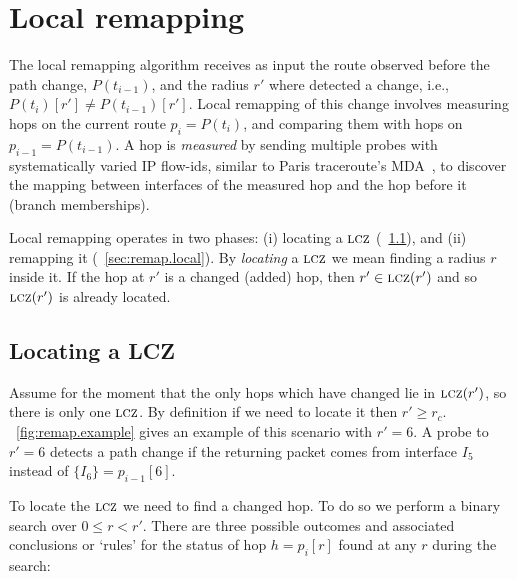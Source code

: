\section{Local remapping}
\label{sec:remap}

\def\Pi{p_i}
\def\Pii{p_{i-1}}

The local remapping algorithm receives as input the route observed
before the path change, $P(t_{i-1})$, and the radius $r'$ where
\dtrack{} detected a change, i.e., $P(t_i)[r'] \ne P(t_{i-1})[r']$.
Local remapping of this change involves measuring hops on the current
route $\Pi=P(t_i)$, and comparing them with hops on
$\Pii\!=\!P(t_{i-1})$.  A hop is \emph{measured} by sending multiple
probes with systematically varied IP flow-ids, similar to Paris
traceroute's MDA~\cite{veitch09balancer}, to discover the mapping
between interfaces of the measured hop and the hop before it (branch
memberships).

Local remapping operates in two phases:  (i)  locating a $\mathrm{\textsc{lcz}}$
(\secstr~\ref{sec:remap.locate}), and (ii) remapping it
(\secstr~\ref{sec:remap.local}).  By \emph{locating} a $\mathrm{\textsc{lcz}}$ we mean
finding a radius $r$ inside it.  If the hop at $r'$ is a changed (added)
hop, then $r'\in\mathrm{\textsc{lcz}}(r')$ and so $\mathrm{\textsc{lcz}}(r')$ is already located.



\subsection{Locating a LCZ}
\label{sec:remap.locate}

Assume for the moment that the only hops which have changed lie in $\mathrm{\textsc{lcz}}(r')$, so there is
only one $\mathrm{\textsc{lcz}}$.  By definition if we need to locate it then $r'\ge r_c$.
\figstr~\ref{fig:remap.example} gives an example of this scenario with $r'=6$.
A probe to $r'=6$ detects a path change if the returning packet comes
from interface $I_5$ instead of $\{I_6\} = \Pii[6]$.

To locate the $\mathrm{\textsc{lcz}}$ we need to find a changed hop.  To do so we perform
a binary search over  $0\le r <r'$.  There are three possible outcomes
and associated conclusions or `rules' for the status of hop $h =\Pi[r]$
found at any $r$ during the search:

